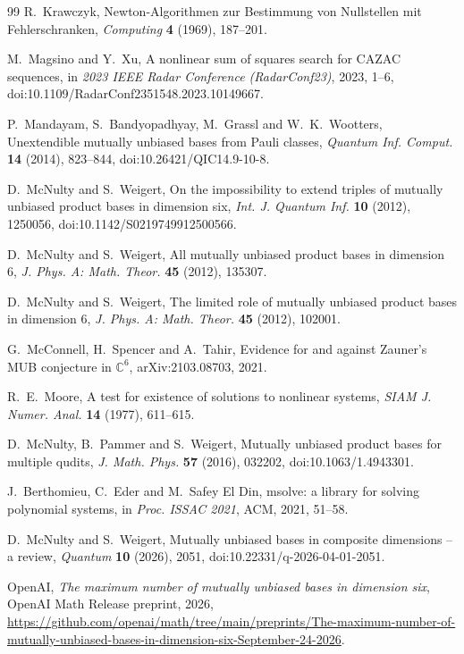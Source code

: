 \documentclass[11pt]{article}
\theoremstyle{definition}
\theoremstyle{remark}
\begin{document}
\begin{thebibliography}{99}
 R.~Krawczyk, Newton-Algorithmen zur Bestimmung von Nullstellen mit Fehlerschranken,
  \emph{Computing} \textbf{4} (1969), 187--201.

 M.~Magsino and Y.~Xu, A nonlinear sum of squares search for CAZAC sequences, in \emph{2023
  IEEE Radar Conference (RadarConf23)}, 2023, 1--6, doi:10.1109/RadarConf2351548.2023.10149667.

 P.~Mandayam, S.~Bandyopadhyay, M.~Grassl and W.~K.~Wootters, Unextendible mutually unbiased bases
  from Pauli classes, \emph{Quantum Inf. Comput.} \textbf{14} (2014), 823--844, doi:10.26421/QIC14.9-10-8.

 D.~McNulty and S.~Weigert, On the impossibility to extend triples of mutually unbiased
  product bases in dimension six, \emph{Int. J. Quantum Inf.} \textbf{10} (2012), 1250056,
  doi:10.1142/S0219749912500566.

 D.~McNulty and S.~Weigert, All mutually unbiased product bases in dimension 6,
  \emph{J. Phys. A: Math. Theor.} \textbf{45} (2012), 135307.

 D.~McNulty and S.~Weigert, The limited role of mutually unbiased product bases in
  dimension 6, \emph{J. Phys. A: Math. Theor.} \textbf{45} (2012), 102001.

 G.~McConnell, H.~Spencer and A.~Tahir, Evidence for and against Zauner's MUB conjecture in
  $\mathbb{C}^6$, arXiv:2103.08703, 2021.

 R.~E.~Moore, A test for existence of solutions to nonlinear systems, \emph{SIAM J. Numer. Anal.}
  \textbf{14} (1977), 611--615.

 D.~McNulty, B.~Pammer and S.~Weigert, Mutually unbiased product bases for multiple qudits,
  \emph{J. Math. Phys.} \textbf{57} (2016), 032202, doi:10.1063/1.4943301.

 J.~Berthomieu, C.~Eder and M.~Safey El Din, msolve: a library for solving polynomial systems, in
  \emph{Proc. ISSAC 2021}, ACM, 2021, 51--58.

 D.~McNulty and S.~Weigert, Mutually unbiased bases in composite dimensions -- a review,
  \emph{Quantum} \textbf{10} (2026), 2051, doi:10.22331/q-2026-04-01-2051.

 OpenAI, \emph{The maximum number of mutually unbiased bases in dimension six}, OpenAI Math Release
  preprint, 2026,
  \url{https://github.com/openai/math/tree/main/preprints/The-maximum-number-of-mutually-unbiased-bases-in-dimension-six-September-24-2026}.


\end{thebibliography}
\end{document}
